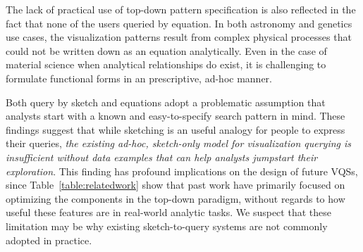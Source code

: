 \par The lack of practical use of top-down pattern specification is also reflected in the fact that none of the users queried by equation. In both astronomy and genetics use cases, the visualization patterns result from complex physical processes that could not be written down as an equation analytically. Even in the case of material science when analytical relationships do exist, it is challenging to formulate functional forms in an prescriptive, ad-hoc manner.
\par Both query by sketch and equations adopt a problematic assumption that analysts start with a known and easy-to-specify search pattern in mind. These findings suggest that while sketching is an useful analogy for people to express their queries, \emph{the existing ad-hoc, sketch-only model for visualization querying is insufficient without data examples that can help analysts jumpstart their exploration}. This finding has profound implications on the design of future VQSs, since Table~\ref{table:relatedwork} show that past work have primarily focused on optimizing the components in the top-down paradigm, without regards to how useful these features are in real-world analytic tasks. We suspect that these limitation may be why existing sketch-to-query systems are not commonly adopted in practice. 

